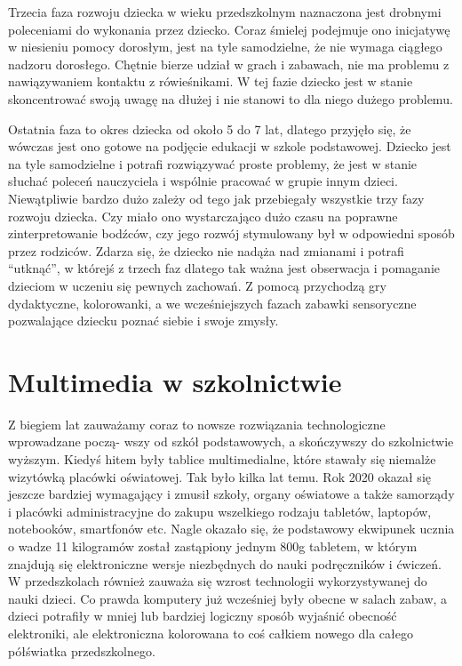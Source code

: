 \documentclass{article}
\begin{document}
\par
Trzecia faza rozwoju dziecka w wieku przedszkolnym naznaczona jest drobnymi poleceniami do wykonania przez dziecko. Coraz śmielej podejmuje ono inicjatywę w niesieniu pomocy dorosłym, jest na tyle samodzielne, że nie wymaga ciągłego nadzoru dorosłego. Chętnie bierze udział w grach i zabawach, nie ma problemu z nawiązywaniem kontaktu z rówieśnikami. W tej fazie dziecko jest w stanie skoncentrować swoją uwagę na dłużej i nie stanowi to dla niego dużego problemu.
\par
Ostatnia faza to okres dziecka od około 5 do 7 lat, dlatego przyjęło się, że wówczas jest ono gotowe na podjęcie edukacji w szkole podstawowej. Dziecko jest na tyle samodzielne i potrafi rozwiązywać proste problemy, że jest w stanie słuchać poleceń nauczyciela i wspólnie pracować w grupie innym dzieci. Niewątpliwie bardzo dużo zależy od tego jak przebiegały wszystkie trzy fazy rozwoju dziecka. Czy miało ono wystarczająco dużo czasu na poprawne zinterpretowanie bodźców, czy jego rozwój stymulowany był w odpowiedni sposób przez rodziców. Zdarza się, że dziecko nie nadąża nad zmianami i potrafi “utknąć”, w którejś z trzech faz dlatego tak ważna jest obserwacja i pomaganie dzieciom w uczeniu się pewnych zachowań. Z pomocą przychodzą gry dydaktyczne, kolorowanki, a we wcześniejszych fazach zabawki sensoryczne pozwalające dziecku poznać siebie i swoje zmysły.



\section{Multimedia w szkolnictwie}
Z biegiem lat zauważamy coraz to nowsze rozwiązania technologiczne wprowadzane począ- wszy od szkół podstawowych, a skończywszy do szkolnictwie wyższym. Kiedyś hitem były tablice multimedialne, które stawały się niemalże wizytówką placówki oświatowej. Tak było kilka lat temu. Rok 2020 okazał się jeszcze bardziej wymagający i zmusił szkoły, organy oświatowe a także samorządy i placówki administracyjne do zakupu wszelkiego rodzaju tabletów, laptopów, notebooków, smartfonów etc. Nagle okazało się, że podstawowy ekwipunek ucznia o wadze 11 kilogramów został zastąpiony jednym 800g tabletem, w którym znajdują się elektroniczne wersje niezbędnych do nauki podręczników i ćwiczeń. W przedszkolach również zauważa się wzrost technologii wykorzystywanej do nauki dzieci. Co prawda komputery już wcześniej były obecne w salach zabaw, a dzieci potrafiły w mniej lub bardziej logiczny sposób wyjaśnić obecność elektroniki, ale elektroniczna kolorowana to coś całkiem nowego dla całego półświatka przedszkolnego. 
\end{document}
